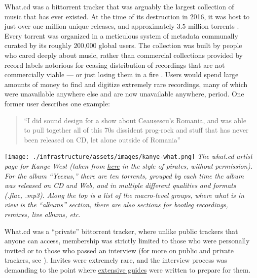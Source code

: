 What.cd was a bittorrent tracker that was arguably the largest
collection of music that has ever existed. At the time of its
destruction in 2016, it was host to just over one million unique
releases, and approximately 3.5 million torrents
\citep{dunhamWhatCDLegacy2018} . Every torrent was organized in a
meticulous system of metadata communally curated by its roughly 200,000
global users. The collection was built by people who cared deeply about
music, rather than commercial collections provided by record labels
notorious for ceasing distribution of recordings that are not
commercially viable --- or just losing them in a fire \citep{rosenDayMusicBurned2019} . Users would spend large amounts of money
to find and digitize extremely rare recordings, many of which were
unavailable anywhere else and are now unavailable anywhere, period. One
former user describes one example:

\begin{quote}
``I did sound design for a show about Ceaușescu's Romania, and was able
to pull together all of this 70s dissident prog-rock and stuff that has
never been released on CD, let alone outside of Romania'' \citep{sonnadEulogyWhatCd2016} 
\end{quote}

\texttt{[image: ./infrastructure/assets/images/kanye-what.png]} \emph{The
what.cd artist page for Kanye West (taken from
\href{https://qz.com/840661/what-cd-is-gone-a-eulogy-for-the-greatest-music-collection-in-the-world/}{here}
in the style of pirates, without permission). For the album ``Yeezus,''
there are ten torrents, grouped by each time the album was released on
CD and Web, and in multiple different qualities and formats (.flac,
.mp3). Along the top is a list of the macro-level groups, where what is
in view is the ``albums'' section, there are also sections for bootleg
recordings, remixes, live albums, etc.}

What.cd was a ``private'' bittorrent tracker, where unlike public
trackers that anyone can access, membership was strictly limited to
those who were personally invited or to those who passed an interview
(for more on public and private trackers, see \citep{meulpolderPublicPrivateBitTorrent} ). Invites were extremely rare,
and the interview process was demanding to the point where
\href{https://opentrackers.org/whatinterviewprep.com/index.html}{extensive
guides} were written to prepare for them.

